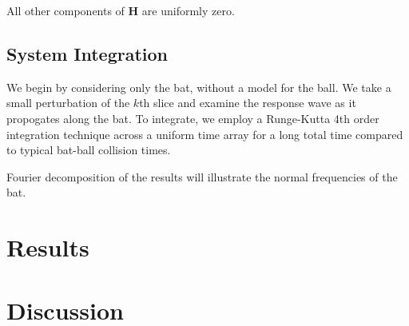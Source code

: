 \documentclass[linenumbers]{aastex7}
\begin{document}
All other components of $\mathbf{H}$ are uniformly zero.

\subsection{System Integration}
We begin by considering only the bat, without a model for the ball. We take a small perturbation of the $k$th slice and examine the response wave as it propogates along the bat. To integrate, we employ a Runge-Kutta 4th order integration technique across a uniform time array for a long total time compared to typical bat-ball collision times. 

Fourier decomposition of the results will illustrate the normal frequencies of the bat. 


\section{Results}



\section{Discussion}



\begin{acknowledgments}

\end{acknowledgments}

{}

\end{document}
